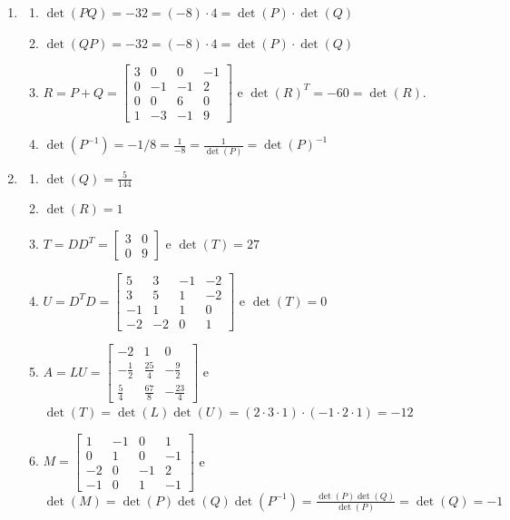 \documentclass[12pt,a4paper]{article}
\begin{document}
\begin{enumerate}
\item \begin{enumerate}
\item $\det(PQ) = -32 = (-8) \cdot 4 = \det(P) \cdot \det(Q)$
\item $\det(QP) = -32 = (-8) \cdot 4 = \det(P) \cdot \det(Q)$
\item $R = P+Q = \begin{bmatrix}
3 &  0 &  0 & -1\\
0 & -1 & -1 &  2\\
0 &  0 &  6 &  0\\
1 & -3 & -1 &  9
\end{bmatrix}$ e $\det(R)^T = -60 = \det(R)$.
\item $\displaystyle \det(P^{-1}) = -1/8 = \frac{1}{-8} = \frac{1}{\det(P)} = \det(P)^{-1}$
\end{enumerate}
\item 
\begin{enumerate}
\item $\det(Q) = \frac{5}{144}$
\item $\det(R) = 1$
\item $T = DD^T = \begin{bmatrix}
3 & 0\\
0 & 9
\end{bmatrix}$ e $\det(T) = 27$
\item $U = D^TD = \begin{bmatrix}
 5 &  3 & -1 & -2\\
 3 &  5 &  1 & -2\\
-1 &  1 &  1 &  0\\
-2 & -2 &  0 &  1
\end{bmatrix}$ e $\det(T) = 0$
\item $A = LU = \begin{bmatrix}
          -2 &            1 &             0 \\
-\frac{1}{2} & \frac{25}{4} &  -\frac{9}{2} \\
 \frac{5}{4} & \frac{67}{8} & -\frac{23}{4}
\end{bmatrix}$ e $\det(T) = \det(L) \det(U) = (2 \cdot 3 \cdot 1) \cdot (-1 \cdot 2 \cdot 1)= -12$
\item $M = \begin{bmatrix}
 1 & -1 &  0 &  1\\
 0 &  1 &  0 & -1\\
-2 &  0 & -1 &  2\\
-1 &  0 &  1 & -1
\end{bmatrix}$ e $\det(M) = \det(P)\det(Q)\det(P^{-1}) = \frac{\det(P)\det(Q)}{\det(P)} = \det(Q) = -1$
\end{enumerate}


\end{enumerate}
\end{document}
